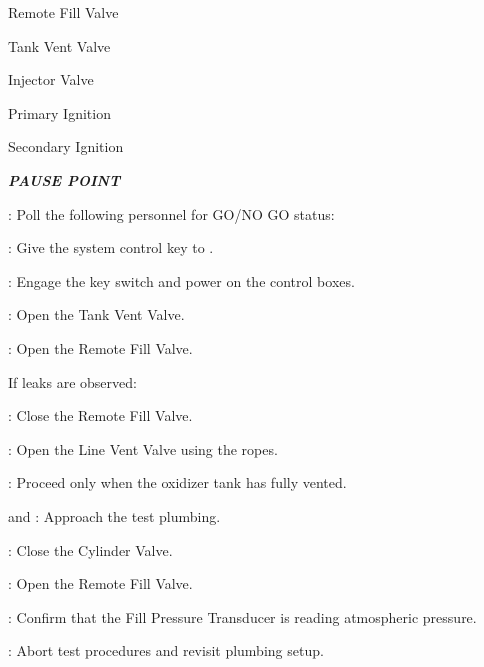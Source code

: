 \begin{checklist}
\begin{checklist}
        \item Remote Fill Valve
        \item Tank Vent Valve
        \item Injector Valve
        \item Primary Ignition
        \item Secondary Ignition
    \end{checklist}
    \item \textbf{\textit{PAUSE POINT}}
    \item \ops{}: Poll the following personnel for GO/NO GO status:
    \begin{checklist}
        \item \peri{}
        \item \perii{}
        \item \periii{}
        \item \heat
        \item \daq{}
        \item \primary{}
        \item \secondary
    \end{checklist}
    \item \secondary: Give the system control key to \primary{}.
    \item \primary{}: Engage the key switch and power on the control boxes.
    \item \primary{}: Open the Tank Vent Valve.
    \item \primary{}: Open the Remote Fill Valve.
    \begin{checklist}[label=$\bullet$]
        \item If leaks are observed:
        \begin{checklist}
            \item \primary{}: Close the Remote Fill Valve.
            \item \primary{}: Open the Line Vent Valve using the ropes.
            \item \secondary: Proceed only when the oxidizer tank has fully vented.
            \item \primary{} and \secondary: Approach the test plumbing.
            \item \primary{}: Close the Cylinder Valve.
            \item \primary{}: Open the Remote Fill Valve.
            \item \daq{}: Confirm that the Fill Pressure Transducer is reading atmospheric pressure.
            \item \ops{}: Abort test procedures and revisit plumbing setup.

\end{checklist}
\end{checklist}
\end{checklist}
